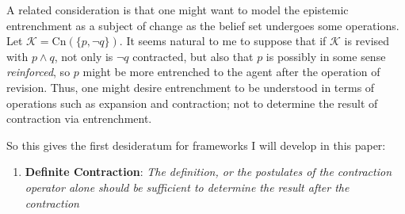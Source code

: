 \documentclass[12pt]{article}
\newcommand{\K}{\mathcal{K}}
\begin{document}
\par
A related consideration is that one might want to model the epistemic entrenchment as a subject of change as the belief set undergoes some operations. Let $\K = \text{Cn}(\{p, \lnot q \})$. It seems natural to me to suppose that if $\K$ is revised with $p \land q$, not only is $\lnot q$ contracted, but also that $p$ is possibly in some sense \textit{reinforced}, so $p$ might be more entrenched to the agent after the operation of revision. Thus, one might desire entrenchment to be understood in terms of operations such as expansion and contraction; not to determine the result of contraction via entrenchment. 
\par
So this gives the first desideratum for frameworks I will develop in this paper:
\begin{enumerate}
    \item[(D1)] \textbf{Definite Contraction}: \textit{The definition, or the postulates of the contraction operator alone should be sufficient to determine the result after the contraction}
\end{enumerate}
\end{document}
